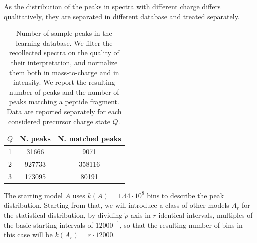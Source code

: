 As the distribution of the peaks in spectra with different charge  differs
qualitatively, they are separated in different database and treated separately.

\begin{table}[!thb]
\centering
\begin{tabular}{ccc}
\hline \hline
$Q$ & N. peaks & N. matched peaks\\
\hline
1 & 31666  & 9071  \\
2 & 927733 & 358116\\
3 & 173095 & 80191\\
\hline \hline
\end{tabular}
\caption{\label{tab:peaksnum}
Number of sample peaks in the learning database. We filter the recollected spectra on
the quality of their interpretation, and normalize them both in mass-to-charge
and in intensity. We report the resulting number of peaks and the number of
peaks matching a peptide fragment. Data are reported separately for each
considered precursor charge state $Q$.}
\end{table}


The starting model $A$ uses $k(A)=1.44\cdot10^8$ bins to describe the peak
distribution. Starting from that, we will introduce a class of other models
$A_r$ for the statistical distribution, by
dividing $\tilde\rho$ axis in $r$ identical intervals, multiples of the basic
starting intervals of $12000^{-1}$, so that  the resulting number of bins in this case will be
$k(A_r)=r\cdot12000$.

